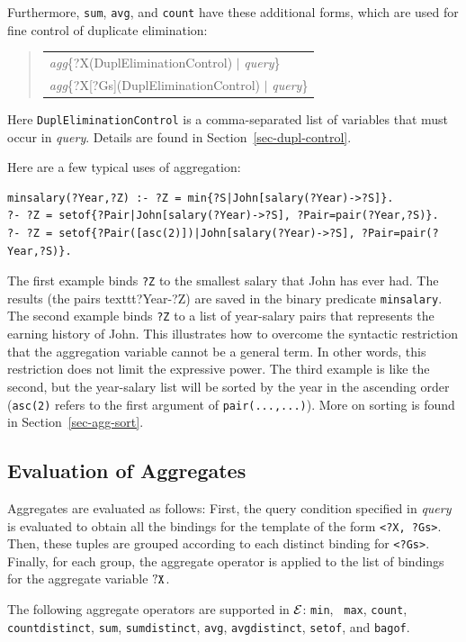 \documentclass[11pt]{article}
\newcommand{\ERGO}{\mbox{\ensuremath{\cal{E}}\smaller{{\sc{RGO}}}}\xspace}
\newcommand{\FLSYSTEM}{\ERGO}
\newenvironment{qrules}{\begin{quote}\tt\begin{tabular}[t]{l}}%
{\end{tabular}\end{quote}}
\begin{document}
Furthermore, \texttt{sum}, \texttt{avg}, and \texttt{count} have these
additional forms, which are used for fine control of duplicate elimination:
\begin{qrules}
\textnormal{\emph{agg}}\{?X(DuplEliminationControl) $|$ {\it query}\}\\
\textnormal{\emph{agg}}\{?X[?Gs](DuplEliminationControl) $|$ {\it query}\}
\end{qrules}
Here \texttt{DuplEliminationControl} is a comma-separated list of variables
that must occur in \emph{query}. Details are found in
Section~\ref{sec-dupl-control}.  

\noindent
Here are a few typical uses of aggregation:
\begin{verbatim}
minsalary(?Year,?Z) :- ?Z = min{?S|John[salary(?Year)->?S]}.
?- ?Z = setof{?Pair|John[salary(?Year)->?S], ?Pair=pair(?Year,?S)}.
?- ?Z = setof{?Pair([asc(2)])|John[salary(?Year)->?S], ?Pair=pair(?Year,?S)}.
\end{verbatim}

The first example binds \texttt{?Z} to the smallest salary that John has
ever had. The results (the pairs texttt{?Year-?Z}) are saved in the binary predicate \texttt{minsalary}.
The second example binds \texttt{?Z} to a list of year-salary   
pairs that represents the earning history of John.
This illustrates how to overcome the syntactic restriction
that the aggregation variable cannot be a general term.
In other words, this restriction does not limit the expressive power.
The third example is like the second, but the year-salary list will be
sorted by the year in the ascending order (\texttt{asc(2)} refers to the
first argument of \texttt{pair(...,...)}). More on sorting is found in
Section~\ref{sec-agg-sort}.


\subsection{Evaluation of Aggregates}\label{sec-aggr-eval}

Aggregates are evaluated as follows: First, the query
condition specified in {\it query} is evaluated to obtain all the bindings
for the template of the form {\tt \texttt{<}?X, ?Gs\texttt{>}}. Then, these
tuples are grouped according to each distinct binding for
{\tt \texttt{<}?Gs\texttt{>}}. Finally, for each group, the aggregate operator
is applied to the list of bindings for the aggregate variable $\tt ?X$.


%
The following aggregate operators are supported in \FLSYSTEM: {\tt min}, {\tt
  max}, {\tt count}, \texttt{countdistinct},
{\tt sum}, \texttt{sumdistinct},  {\tt avg}, \texttt{avgdistinct},
{\tt setof}, and {\tt bagof}. 
\end{document}
